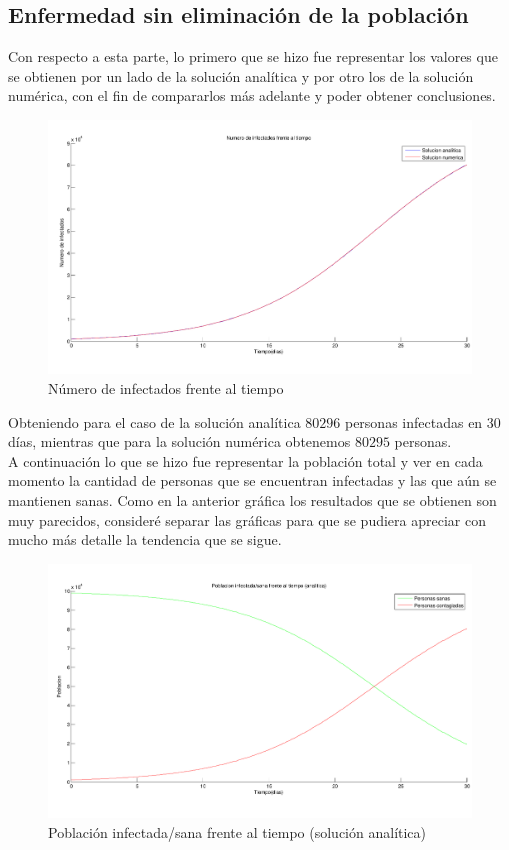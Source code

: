 \documentclass[a4paper,11pt]{article}
\numberwithin{equation}{section}
\begin{document}
\subsection{Enfermedad sin eliminación de la población}
\indent Con respecto a esta parte, lo primero que se hizo fue representar los valores que se obtienen por un lado de la solución analítica y por otro los de la solución numérica, con el fin de compararlos más adelante y poder obtener conclusiones.
\begin{figure}[h!]
		\centering 		
		\includegraphics[width=1\textwidth]{grafica1.pdf}
		\caption{Número de infectados frente al tiempo}
		\label{Fig:1}
\end{figure}

\indent Obteniendo para el caso de la solución analítica $ 80296 $ personas infectadas en 30 días, mientras que para la solución numérica obtenemos $ 80295 $ personas. \\

\indent A continuación lo que se hizo fue representar la población total y ver en cada momento la cantidad de personas que se encuentran infectadas y las que aún se mantienen sanas. Como en la anterior gráfica los resultados que se obtienen son muy parecidos, consideré separar las gráficas para que se pudiera apreciar con mucho más detalle la tendencia que se sigue.

\begin{figure}[h!]
	\centering 		
	\includegraphics[width=1\textwidth]{grafica2.pdf}
	\caption{Población infectada/sana frente al tiempo (solución analítica)}
	\label{Fig:2}
\end{figure}
\end{document}
